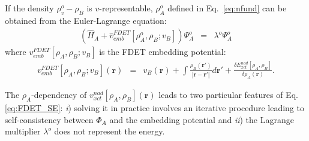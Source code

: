 \documentclass[amsmath,amssymb,preprint,aip,jcp]{revtex4-1}
\begin{document}
If the density $\rho^{o}_{v}-\rho_{B}$ is $v$-representable, $\rho_A^{o}$ defined in Eq.~\ref{eq:nfund} can be obtained from the Euler-Lagrange equation:
\begin{eqnarray}
 \left( \hat{H}_A + \hat{v}_{emb}^{{FDET}}[\rho_A^{{o}}, \rho_B; v_B] \right) \Psi_A^{{o}} &=& \lambda^{o}\Psi_A^{{o}} \label{eq:FDET_SE} 
\end{eqnarray}
where $v_{emb}^{{FDET}}[\rho_A,\rho_B; v_B]$
is the FDET embedding potential:
\begin{eqnarray}
v_{emb}^{{FDET}}[\rho_A,\rho_B; v_B](\mathbf{r}) &=& v_B(\mathbf{r}) + \int \frac{\rho_B(\mathbf{r}')}{|\mathbf{r}-\mathbf{r}'|} d\mathbf{r}'+ \frac{\delta E_{xct}^{nad}[\rho_A,\rho_B]}{\delta\rho_A(\mathbf{r})}.
\label{eq:nFDET_embpot} 
\end{eqnarray}

The $\rho_A$-dependency of $v_{xct}^{nad}[\rho_A,\rho_B](\mathbf{r})$ leads to two 
particular features of Eq. \ref {eq:FDET_SE}: 
{\it i}) solving it in practice involves an iterative procedure leading to self-consistency between $\Phi_A$ and the embedding potential
 and 
 {\it ii}) the Lagrange multiplier $\lambda^{o}$ does not represent the energy.
\end{document}
